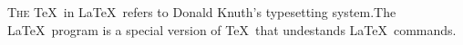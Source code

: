 \documentclass{article}
\begin{document}
	\lettrine{T}{he} \TeX\ in \LaTeX\ refers to Donald Knuth's typesetting system.The \LaTeX\
	program is a special version of \TeX\ that undestands \LaTeX\ commands.
\end{document}
